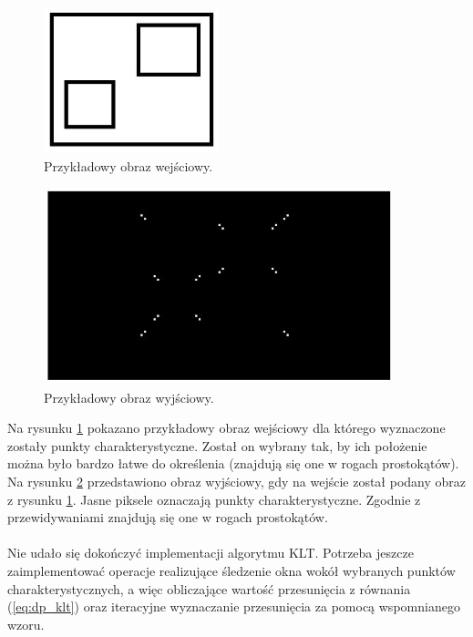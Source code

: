 \begin{figure}[H]
	\centering
	\includegraphics[width=2in]{test.jpg}
	\caption{Przykładowy obraz wejściowy.}
	\label{fig:test}
\end{figure}

\begin{figure}[H]
	\centering
	\includegraphics[width=4in]{test_out.jpg}
	\caption{Przykładowy obraz wyjściowy.}
	\label{fig:test_out}
\end{figure}

\noindent Na rysunku \ref{fig:test} pokazano przykładowy obraz wejściowy dla którego wyznaczone zostały punkty charakterystyczne. Został on wybrany tak, by ich położenie można było bardzo łatwe do określenia (znajdują się one w rogach prostokątów).\newline
Na rysunku \ref{fig:test_out} przedstawiono obraz wyjściowy, gdy na wejście został podany obraz z rysunku \ref{fig:test}. Jasne piksele oznaczają punkty charakterystyczne. Zgodnie z przewidywaniami znajdują się one w rogach prostokątów.

\paragraph*{}
Nie udało się dokończyć implementacji algorytmu KLT. Potrzeba jeszcze zaimplementować operacje realizujące śledzenie okna wokół wybranych punktów charakterystycznych, a więc obliczające wartość przesunięcia z równania (\ref{eq:dp_klt}) oraz iteracyjne wyznaczanie przesunięcia za pomocą wspomnianego wzoru.

